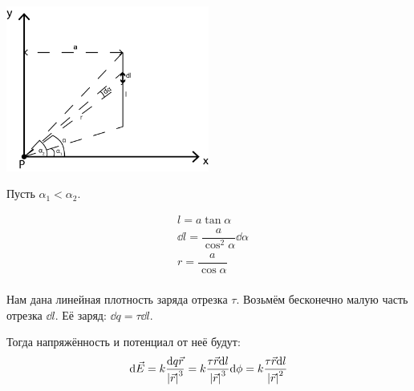\documentclass[12pt]{report}
\begin{document}
\begin{center}
    \includegraphics[width=0.5\textwidth]{graphics/t01.png}
\end{center}

Пусть $\alpha_1 < \alpha_2$.

\begin{align*}
     & l = a\tan \alpha                            \\
     & \dd l = \dfrac{a }{\cos^2 \alpha}\dd \alpha \\
     & r = \dfrac{a}{\cos \alpha}                  \\
\end{align*}

Нам дана линейная плотность заряда отрезка $\tau$. Возьмём бесконечно малую часть отрезка $\dd l$. Её заряд: $\dd q = \tau \dd l$.

Тогда напряжённость и потенциал от неё будут:
\[
    \dd \vec{E} = k \dfrac{\dd q \vec{r}}{\abs{\vec{r}}^3} = k \dfrac{\tau \vec{r} \dd l}{\abs{\vec{r}}^3}
    \\
    \dd \phi = k \dfrac{\tau \vec{r} \dd l}{\abs{\vec{r}}^2}
\]
\end{document}
